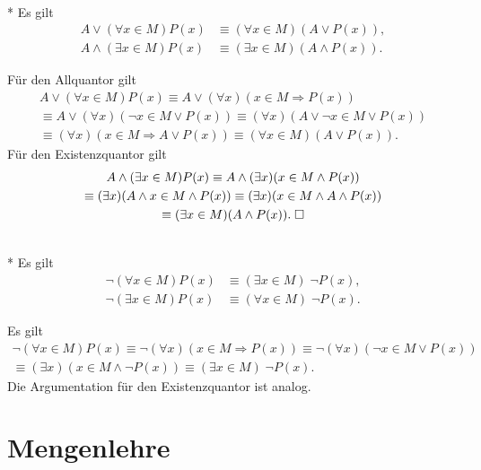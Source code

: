 \begin{Satz}%
\label{logical-dist-general}\mbox{}\\*
Es gilt
\begin{align*}
A\lor (\forall x\in M)P(x) &\equiv (\forall x\in M)(A\lor P(x)),\\
A\land(\exists x\in M)P(x) &\equiv (\exists x\in M)(A\land P(x)).
\end{align*}
\end{Satz}
 Für den Allquantor gilt
\begin{gather}
A\lor (\forall x\in M)P(x)
\equiv A\lor(\forall x)(x\in M\Rightarrow P(x))\\
\equiv A\lor(\forall x)(\neg x\in M\lor P(x))
\equiv (\forall x)(A\lor\neg x\in M\lor P(x))\\
\equiv (\forall x)(x\in M\Rightarrow A\lor P(x))
\equiv (\forall x\in M)(A\lor P(x)).
\end{gather}
Für den Existenzquantor gilt
\begin{gather}
A\land (\exists x\in M)P(x)
\equiv A\land(\exists x)(x\in M\land P(x))\\
\equiv (\exists x)(A\land x\in M\land P(x))
\equiv (\exists x)(x\in M\land A\land P(x))\\
\equiv (\exists x\in M)(A\land P(x)).\;\Box
\end{gather}

\begin{Satz}\mbox{}\\*
Es gilt
\begin{align*}
\neg (\forall x\in M)P(x) &\equiv (\exists x\in M)\;\neg P(x),\\
\neg (\exists x\in M)P(x) &\equiv (\forall x\in M)\;\neg P(x).
\end{align*}
\end{Satz}
 Es gilt
\begin{gather}
\neg(\forall x\in M)P(x) \equiv \neg(\forall x)(x\in M\Rightarrow P(x))
\equiv \neg(\forall x)(\neg x\in M\lor P(x))\\
\equiv (\exists x)(x\in M\land \neg P(x))
\equiv (\exists x\in M)\;\neg P(x).
\end{gather}
Die Argumentation für den Existenzquantor ist analog.\;\qedsymbol

\newpage
\section{Mengenlehre}

